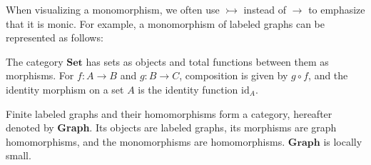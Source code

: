 When visualizing a monomorphism, we often use $\rightarrowtail$ instead of $\to$ to emphasize that it is monic. For example, a monomorphism of labeled graphs can be represented as follows:
\begin{center}
    \end{center}

\begin{example}
The category \(\mathbf{Set}\) has sets as objects and total functions between them as morphisms. For \(f\mathop{\colon} A \mathop{\to} B\) and \(g\mathop{\colon} B \mathop{\to} C\), composition is given by \(g\circ f\), and the identity morphism on a set \(A\) is the identity function \(\mathrm{id}_A\).
\end{example}

\begin{example} 
    Finite labeled graphs and their homomorphisms form a category, hereafter denoted by \textbf{Graph}. Its objects are labeled graphs, its morphisms are graph homomorphisms, and the monomorphisms are homomorphisms. 
    $\textbf{Graph}$ is locally small. 
\end{example}

 
